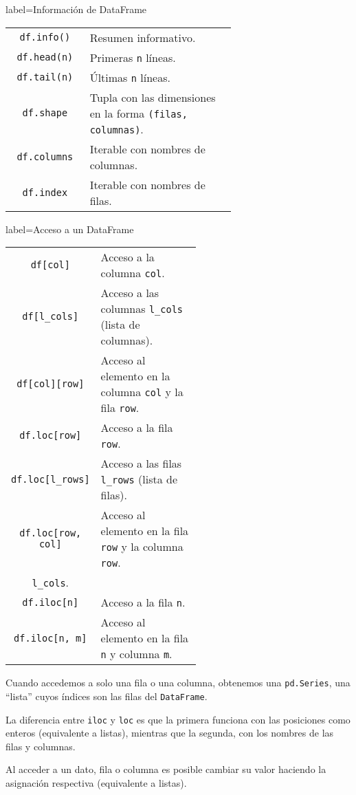 \begin{contentbox}{label=Información de DataFrame}
    \begin{tabular}{C|p{0.65\linewidth}}
        \lstinline!df.info()! & Resumen informativo. \\
        \lstinline!df.head(n)! &  Primeras \texttt{n} líneas. \\
        \lstinline!df.tail(n)! &  Últimas \texttt{n} líneas. \\
        \lstinline!df.shape! & Tupla con las dimensiones en la forma \lstinline!(filas, columnas)!. \\
        \lstinline!df.columns! &  Iterable con nombres de columnas. \\
        \lstinline!df.index! &  Iterable con nombres de filas.
    \end{tabular}
\end{contentbox}

\begin{contentbox}{label=Acceso a un DataFrame}
    \begin{tabular}{C|p{0.55\linewidth}}
        \lstinline!df[col]! & Acceso a la columna \texttt{col}. \\
        \lstinline!df[l_cols]! & Acceso a las columnas \lstinline!l_cols! (lista de columnas). \\
        \lstinline!df[col][row]! &  Acceso al elemento en la columna \texttt{col} y la fila \texttt{row}. \\
        \lstinline!df.loc[row]! & Acceso a la fila \texttt{row}. \\
        \lstinline!df.loc[l_rows]! & Acceso a las filas \lstinline!l_rows! (lista de filas). \\
        \lstinline!df.loc[row, col]! &  Acceso al elemento en la fila \texttt{row} y la columna \texttt{row}. \\
        \lstinline!l_cols!. \\
        \lstinline!df.iloc[n]! &  Acceso a la fila \texttt{n}. \\
        \lstinline!df.iloc[n, m]! &  Acceso al elemento en la fila \texttt{n} y columna \texttt{m}. \\
    \end{tabular}
    
    Cuando accedemos a solo una fila o una columna, obtenemos una \lstinline!pd.Series!, una ``lista'' cuyos índices son las filas del \texttt{DataFrame}.
    
    La diferencia entre \texttt{iloc} y \texttt{loc} es que la primera funciona con las posiciones como enteros (equivalente a listas), mientras que la segunda, con los \alert{nombres} de las filas y columnas.
    
    Al acceder a un dato, fila o columna es posible cambiar su valor haciendo la asignación respectiva (equivalente a listas).
\end{contentbox}

